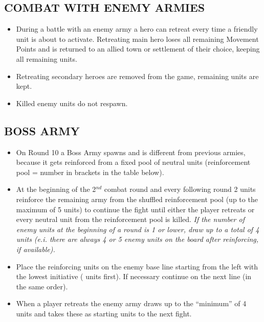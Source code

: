 \subsection*{\MakeUppercase{Combat with enemy armies}}

\begin{itemize}
    \item During a battle with an enemy army a hero can retreat every time a friendly unit is about to 
    activate. Retreating main hero loses all remaining Movement Points and is returned to an
    allied town or settlement of their choice, keeping all remaining units.
    \item Retreating secondary heroes are removed from the game, remaining units are kept. 
    \item Killed enemy units do not respawn. 
\end{itemize}

\subsection*{\MakeUppercase{Boss army}}

\begin{itemize}
    \item On Round 10 a Boss Army spawns and is different from previous armies, because it gets reinforced 
    from a fixed pool of neutral units (reinforcement pool = number in brackets in the table below).
    \item At the beginning of the 2$^{nd}$ combat round and every following round 2 units reinforce the
    remaining army from the shuffled reinforcement pool (up to the maximum of 5 units) to
    continue the fight until either the player retreats or every neutral unit from the reinforcement
    pool is killed. \textit{If the number of enemy units at the beginning of a round is 1 or lower, draw up to 
    a total of 4 units (e.i. there are always 4 or 5 enemy units on the board after reinforcing, if available).}
    \item Place the reinforcing units on the enemy base line starting from the left with the lowest initiative
    ( units first). If necessary continue on the next line (in the same order).
    \item When a player retreats the enemy army draws up to the ``minimum'' of 4 units and takes these
    as starting units to the next fight. 
\end{itemize}

